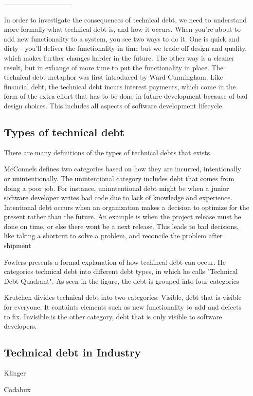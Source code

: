 ------------------------------

In order to investigate the consequences of technical debt, we need to understand more formally what technical debt is, and how it occurs. When you're about to add new functionality to a system, you see two ways to do it. One is quick and dirty - you'll deliver the functionality in time but we trade off design and quality, which makes further changes harder in the future. The other way is a cleaner result, but in exhange of more time to put the functionality in place. The technical debt metaphor was first introduced by Ward Cunningham\cite{cunningham}. Like financial debt, the technical debt incurs interest payments, which come in the form of the extra effort that has to be done in future development because of bad design choices\cite{fowler}. This includes all aspects of software development lifecycle. 

\subsection{Types of technical debt}
There are many definitions of the types of technical debts that exists.


McConnels defines two categories based on how they are incurred, intentionally or unintentionally. The unintentional category includes debt that comes from doing a poor job. For instance, uninntentional debt might be when a junior software developer writes bad code due to lack of knowledge and experience. Intentional debt occurs when an organization makes a decision to optimize for the present rather than the future. An example is when the project release must be done on time, or else there wont be a next release. This leads to bad decisions, like taking a shortcut to solve a problem, and reconcile the problem after shipment

Fowlers presents a formal explanation of how techincal debt can occur. He categories technical debt into different debt types, in which he calls "Technical Debt Quadrant". As seen in the figure, the debt is grouped into four categories

Krutchen divides technical debt into two categories. Visible, debt that is visible for everyone. It containts elements such as new functionality to add and defects to fix. Invisible is the other category, debt that is only visible to software developers.



\subsection{Technical debt in Industry}

Klinger

Codabux
